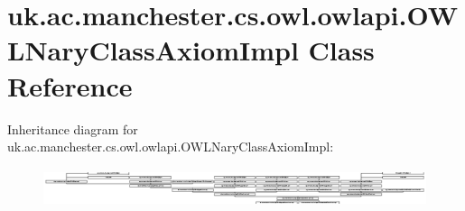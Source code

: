 \hypertarget{classuk_1_1ac_1_1manchester_1_1cs_1_1owl_1_1owlapi_1_1_o_w_l_nary_class_axiom_impl}{\section{uk.\-ac.\-manchester.\-cs.\-owl.\-owlapi.\-O\-W\-L\-Nary\-Class\-Axiom\-Impl Class Reference}
\label{classuk_1_1ac_1_1manchester_1_1cs_1_1owl_1_1owlapi_1_1_o_w_l_nary_class_axiom_impl}
}
Inheritance diagram for uk.\-ac.\-manchester.\-cs.\-owl.\-owlapi.\-O\-W\-L\-Nary\-Class\-Axiom\-Impl\-:\begin{figure}[H]
\begin{center}
\leavevmode
\includegraphics[height=1.133890cm]{classuk_1_1ac_1_1manchester_1_1cs_1_1owl_1_1owlapi_1_1_o_w_l_nary_class_axiom_impl}
\end{center}
\end{figure}
